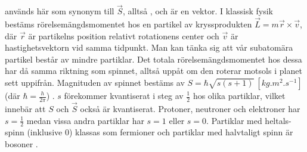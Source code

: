 \documentclass[11pt, a4paper]{article}
\begin{document}
 används här som synonym till $\vec{S}$, alltså , och är en vektor. I klassisk fysik bestäms rörelse\-mängdsmomentet hos en partikel av kryssprodukten $\vec{L}=m\vec{r}\times\vec{v}$, där $\vec{r}$ är partikelns position relativt rotationens center och $\vec{v}$ är hastighetsvektorn vid samma tidpunkt. Man kan tänka sig att vår subatomära partikel består av mindre partiklar. Det totala rörelsemängdsmomentet hos dessa har då samma riktning som spinnet, alltså uppåt om den roterar motsols i planet sett uppifrån. Magnituden av spinnet bestäms av $S=\hbar\sqrt{s(s+1)}\:\left[\si{kg.m^2.s^{-1}}\right]$ (där $\hbar=\frac{h}{2\pi}$) \parencite{college_physics}. $s$ förekommer kvantiserat i steg av $\frac{1}{2}$ hos olika partiklar, vilket innebär att $S$ och $\vec{S}$ också är kvantiserat. Protoner, neutroner och elektroner har $s=\frac{1}{2}$ medan vissa andra partiklar har $s=1$ eller $s=0$. Partiklar med heltals-spinn (inklusive 0) klassas som fermioner och partiklar med halvtaligt spinn är bosoner \parencite{subatomic_particles}.
\end{document}
